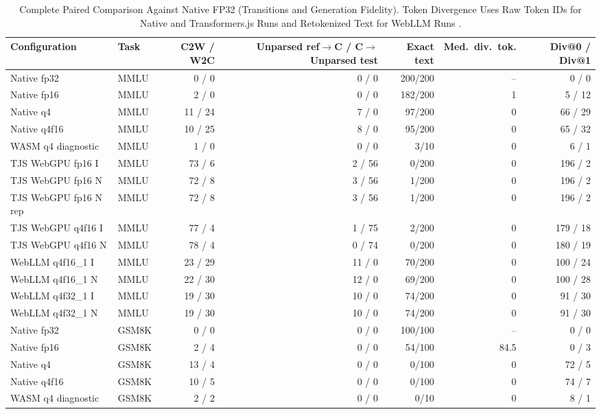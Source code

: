 \documentclass[conference]{IEEEtran}
\begin{document}
\begin{table}[!t]
\caption{
Complete Paired Comparison Against Native FP32 (Transitions and Generation Fidelity).
Token Divergence Uses Raw Token IDs for Native and Transformers.js Runs and Retokenized Text for WebLLM Runs \cite{repository}.
}
\label{tab:complete_transitions}
\centering
\small
\setlength{\tabcolsep}{6pt}
\begin{tabular}{@{}llrrrrr@{}}
\toprule
Configuration & Task & C2W / W2C & Unparsed ref$\to$C / C$\to$Unparsed test & Exact text & Med.\ div.\ tok. & Div@0 / Div@1\\
\midrule
Native fp32 & MMLU & 0 / 0 & 0 / 0 & 200/200 & -- & 0 / 0\\
Native fp16 & MMLU & 2 / 0 & 0 / 0 & 182/200 & 1 & 5 / 12\\
Native q4 & MMLU & 11 / 24 & 7 / 0 & 97/200 & 0 & 66 / 29\\
Native q4f16 & MMLU & 10 / 25 & 8 / 0 & 95/200 & 0 & 65 / 32\\
WASM q4 diagnostic & MMLU & 1 / 0 & 0 / 0 & 3/10 & 0 & 6 / 1\\
TJS WebGPU fp16 I & MMLU & 73 / 6 & 2 / 56 & 0/200 & 0 & 196 / 2\\
TJS WebGPU fp16 N & MMLU & 72 / 8 & 3 / 56 & 1/200 & 0 & 196 / 2\\
TJS WebGPU fp16 N rep & MMLU & 72 / 8 & 3 / 56 & 1/200 & 0 & 196 / 2\\
TJS WebGPU q4f16 I & MMLU & 77 / 4 & 1 / 75 & 2/200 & 0 & 179 / 18\\
TJS WebGPU q4f16 N & MMLU & 78 / 4 & 0 / 74 & 0/200 & 0 & 180 / 19\\
WebLLM q4f16\_1 I & MMLU & 23 / 29 & 11 / 0 & 70/200 & 0 & 100 / 24\\
WebLLM q4f16\_1 N & MMLU & 22 / 30 & 12 / 0 & 69/200 & 0 & 100 / 28\\
WebLLM q4f32\_1 I & MMLU & 19 / 30 & 10 / 0 & 74/200 & 0 & 91 / 30\\
WebLLM q4f32\_1 N & MMLU & 19 / 30 & 10 / 0 & 74/200 & 0 & 91 / 30\\
\midrule
Native fp32 & GSM8K & 0 / 0 & 0 / 0 & 100/100 & -- & 0 / 0\\
Native fp16 & GSM8K & 2 / 4 & 0 / 0 & 54/100 & 84.5 & 0 / 3\\
Native q4 & GSM8K & 13 / 4 & 0 / 0 & 0/100 & 0 & 72 / 5\\
Native q4f16 & GSM8K & 10 / 5 & 0 / 0 & 0/100 & 0 & 74 / 7\\
WASM q4 diagnostic & GSM8K & 2 / 2 & 0 / 0 & 0/10 & 0 & 8 / 1\\

\end{tabular}
\end{table}
\end{document}
